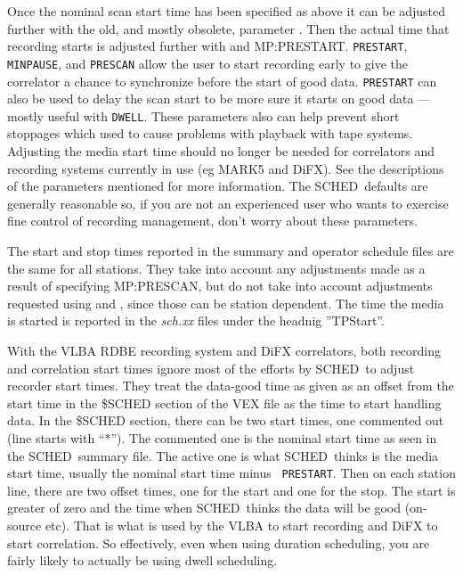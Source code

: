\documentclass{report}
\newcommand{\schedb}{{\sc SCHED~}}
\begin{document}
Once the nominal scan start time has been specified as above it can be
adjusted further with the old, and mostly obsolete, parameter
.  Then the actual time that
recording starts is adjusted further with  and  {MP:PRESTART}.
{\tt PRESTART}, {\tt MINPAUSE}, and {\tt PRESCAN} allow the user to
start recording early to give the correlator a chance to synchronize
before the start of good data.  {\tt PRESTART} can also be used to
delay the scan start to be more sure it starts on good data --- mostly
useful with {\tt DWELL}.  These parameters also can help prevent short
stoppages which used to cause problems with playback with tape
systems.  Adjusting the media start time should no longer be needed
for correlators and recording systems currently in use (eg MARK5 and
DiFX).  See the descriptions of the parameters mentioned for more
information.  The \schedb defaults are generally reasonable so, if you
are not an experienced user who wants to exercise fine control of
recording management, don't worry about these parameters.

The start and stop times reported in the summary and operator schedule
files are the same for all stations.  They take into account any
adjustments made as a result of specifying 
{MP:PRESCAN}, but do not take into account adjustments requested using
 and , since those can be station dependent.  The
time the media is started is reported in the {\sl sch.xx} files
under the headnig ''TPStart''.

With the VLBA RDBE recording system and DiFX correlators, both
recording and correlation start times ignore most of the efforts by
\schedb to adjust recorder start times.  They treat the data-good time
as given as an offset from the start time in the \$SCHED section of
the VEX file as the time to start handling data.  In the \$SCHED
section, there can be two start times, one commented out (line starts
with ``*'').  The commented one is the nominal start time as seen in
the \schedb summary file.  The active one is what \schedb thinks is
the media start time, usually the nominal start time minus {\tt
PRESTART}.  Then on each station line, there are two offset times, one
for the start and one for the stop.  The start is greater of zero and
the time when \schedb thinks the data will be good (on-source etc).
That is what is used by the VLBA to start recording and DiFX to start
correlation.  So effectively, even when using duration scheduling, you
are fairly likely to actually be using dwell scheduling.
\end{document}
